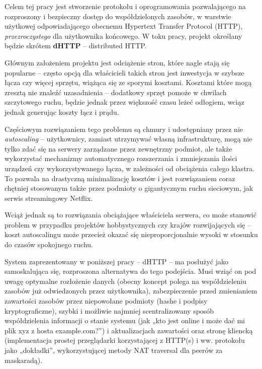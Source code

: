 Celem tej pracy jest stworzenie protokołu i oprogramowania pozwalającego na rozproszony i bezpieczny dostęp do współdzielonych zasobów, w warstwie użytkowej odpowiadającego obecnemu Hypertext Transfer Protocol (HTTP), {\em przezroczystego} dla użytkownika końcowego. W toku pracy, projekt określany będzie skrótem \textbf{dHTTP} -- distributed HTTP.

Głównym założeniem projektu jest odciążenie stron, które nagle stają się popularne -- często opcją dla właścicieli takich stron jest inwestycja w szybsze łącza czy więcej sprzętu, wiążąca się ze sporymi kosztami. Kosztami które mogą zresztą nie znaleźć uzasadnienia -- dodatkowy sprzęt pomoże w chwilach szczytowego ruchu, będzie jednak przez większość czasu leżeć odłogiem, wciąz jednak generując koszty łącz i prądu.


Częściowym rozwiązaniem tego problemu są chmury i udostępniany przez nie {\em autoscaling} -- użytkownicy, zamiast utrzymywać własną infrastrukturę, mogą nie tylko zdać się na serwery zarządzane przez zewnętrzny podmiot, ale także wykorzystać mechanizmy automatycznego rozszerzania i zmniejszania ilości urządzeń czy wykorzystywanego łącza, w zależności od obciążenia całego klastra. To pozwala na drastyczną minimalizację kosztów i jest rozwiązaniem coraz chętniej stosowanym także przez podmioty o gigantycznym ruchu sieciowym, jak serwis streamingowy Netflix.

Wciąż jednak są to rozwiązania obciążające właściciela serwera, co może stanowić problem w przypadku projektów hobbystycznych czy krajów rozwijających się -- koszt autoscalingu może przecież okazać się nieproporcjonalnie wysoki w stosunku do czasów spokojnego ruchu.

System zaprezentowany w poniższej pracy -- dHTTP -- ma posłużyć jako samoskalująca się, rozproszona alternatywa do tego podejścia. Musi wziąć on pod uwagę optymalne rozłożenie danych (obecny koncept polega na współdzieleniu zasobów już odwiedzonych przez użytkownika), zabezpieczenie przed zmienianiem zawartości zasobów przez niepowołane podmioty (hashe i podpisy kryptograficzne), szybki i możliwie najmniej scentralizowany sposób współdzielenia informacji o stanie systemu (jak „kto jest online i może dać mi plik xyz z hosta example.com?”) i aktualizacjach zawartości oraz stronę kliencką (implementacja prostej przeglądarki korzystającej z HTTP(s) i ww. protokołu jako „dokładki”, wykorzystującej metody NAT traversal dla peerów za maskaradą). 